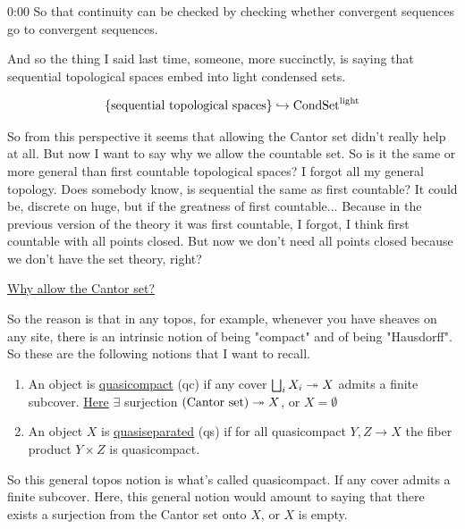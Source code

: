 \begin{unfinished}{0:00}
So that continuity can be checked by checking whether convergent sequences go to convergent sequences.

And so the thing I said last time, someone, more succinctly, is saying that sequential topological spaces embed into light condensed sets.

\begin{align*}
\{ \text{sequential topological spaces} \} \hookrightarrow \mathrm{Cond}\mathrm{Set}^{\mathrm{light}} 
\end{align*}

So from this perspective it seems that allowing the Cantor set didn't really help at all. But now I want to say why we allow the countable set. So is it the same or more general than first countable topological spaces? I forgot all my general topology. Does somebody know, is sequential the same as first countable? It could be, discrete on huge, but if the greatness of first countable... Because in the previous version of the theory it was first countable, I forgot, I think first countable with all points closed. But now we don't need all points closed because we don't have the set theory, right?

\underline{Why allow the Cantor set?}

So the reason is that in any topos, for example, whenever you have sheaves on any site, there is an intrinsic notion of being "compact" and of being "Hausdorff". So these are the following notions that I want to recall.


\begin{definition}

\begin{enumerate}
\item An object is \underline{quasicompact} (qc) if any cover $\bigsqcup_i X_i \twoheadrightarrow X$ admits a finite subcover. \underline{Here} $\exists$ surjection $\text{(Cantor set)} \twoheadrightarrow X$, or $X = \emptyset$ 
\item An object $X$ is \underline{quasiseparated} (qs) if for all quasicompact $Y, Z \to X$ the fiber product $Y \times Z$ is quasicompact. 
\end{enumerate}

\end{definition}

So this general topos notion is what's called quasicompact. If any cover admits a finite subcover. Here, this general notion would amount to saying that there exists a surjection from the Cantor set onto $X$, or $X$ is empty. 


\end{unfinished}
